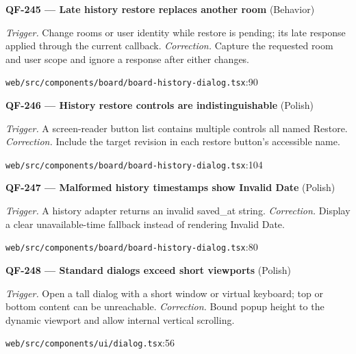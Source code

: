 \begin{minipage}{\linewidth}
\textbf{QF-245 --- Late history restore replaces another room} {\scriptsize\color{accent}(Behavior)}\par
\textit{Trigger.} Change rooms or user identity while restore is pending; its late response applied through the current callback. \textit{Correction.} Capture the requested room and user scope and ignore a response after either changes.\par
{\scriptsize\color{muted}\nolinkurl{web/src/components/board/board-history-dialog.tsx}:90}\par
\end{minipage}\par\vspace{7pt}
\begin{minipage}{\linewidth}
\textbf{QF-246 --- History restore controls are indistinguishable} {\scriptsize\color{accent}(Polish)}\par
\textit{Trigger.} A screen-reader button list contains multiple controls all named Restore. \textit{Correction.} Include the target revision in each restore button's accessible name.\par
{\scriptsize\color{muted}\nolinkurl{web/src/components/board/board-history-dialog.tsx}:104}\par
\end{minipage}\par\vspace{7pt}
\begin{minipage}{\linewidth}
\textbf{QF-247 --- Malformed history timestamps show Invalid Date} {\scriptsize\color{accent}(Polish)}\par
\textit{Trigger.} A history adapter returns an invalid saved\_at string. \textit{Correction.} Display a clear unavailable-time fallback instead of rendering Invalid Date.\par
{\scriptsize\color{muted}\nolinkurl{web/src/components/board/board-history-dialog.tsx}:80}\par
\end{minipage}\par\vspace{7pt}
\begin{minipage}{\linewidth}
\textbf{QF-248 --- Standard dialogs exceed short viewports} {\scriptsize\color{accent}(Polish)}\par
\textit{Trigger.} Open a tall dialog with a short window or virtual keyboard; top or bottom content can be unreachable. \textit{Correction.} Bound popup height to the dynamic viewport and allow internal vertical scrolling.\par
{\scriptsize\color{muted}\nolinkurl{web/src/components/ui/dialog.tsx}:56}\par
\end{minipage}\par\vspace{7pt}
